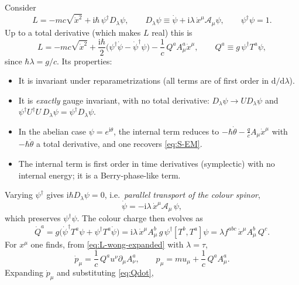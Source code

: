 \documentclass[11pt,a4paper]{book}
\numberwithin{equation}{section}
\newcommand{\dd}{\mathrm{d}}
\newcommand{\ii}{\mathrm{i}}
\theoremstyle{definition}
\theoremstyle{remark}
\begin{document}
Consider
\begin{equation}
  L=-mc\sqrt{\dot x^2}+\ii\hbar\,\psi^\dagger D_\lambda\psi,\qquad
  D_\lambda\psi\equiv\dot\psi+\ii\lambda\,\dot x^\mu\mathcal A_\mu\psi,\qquad
  \psi^\dagger\psi=1 .
  \label{eq:L-wong}
\end{equation}
Up to a total derivative (which makes $L$ real) this is
\begin{equation}
  L=-mc\sqrt{\dot x^2}+\frac{\ii\hbar}2\bigl(\psi^\dagger\dot\psi-\dot\psi^\dagger\psi\bigr)
  -\frac1c\,Q^aA^a_\mu\dot x^\mu,\qquad
  Q^a\equiv g\,\psi^\dagger T^a\psi,
  \label{eq:L-wong-expanded}
\end{equation}
since $\hbar\lambda=g/c$.  Its properties:
\begin{itemize}[leftmargin=*]
\item It is invariant under reparametrizations (all terms are of first order
  in $\dd/\dd\lambda$).
\item It is \emph{exactly} gauge invariant, with no total derivative:
  $D_\lambda\psi\to U D_\lambda\psi$ and $\psi^\dagger U^\dagger U\,D_\lambda\psi=\psi^\dagger D_\lambda\psi$.
\item In the abelian case $\psi=e^{\ii\theta}$, the internal term reduces to
  $-\hbar\dot\theta-\tfrac qcA_\mu\dot x^\mu$ with $-\hbar\dot\theta$ a total
  derivative, and one recovers \eqref{eq:S-EM}.
\item The internal term is first order in time derivatives (symplectic)
  with no internal energy; it is a Berry-phase-like term.
\end{itemize}
Varying $\psi^\dagger$ gives $\ii\hbar D_\lambda\psi=0$, i.e.\ \emph{parallel
transport of the colour spinor},
\begin{equation}
  \dot\psi=-\ii\lambda\,\dot x^\mu\mathcal A_\mu\,\psi ,
  \label{eq:psi-transport}
\end{equation}
which preserves $\psi^\dagger\psi$.  The colour charge then evolves as
\begin{equation}
  \dot Q^a=g\bigl(\dot\psi^\dagger T^a\psi+\psi^\dagger T^a\dot\psi\bigr)
  =\ii\lambda\,\dot x^\mu A^b_\mu\,g\,\psi^\dagger[T^b,T^a]\psi
  =\lambda f^{abc}\,\dot x^\mu A^b_\mu\,Q^c .
  \label{eq:Qdot}
\end{equation}
For $x^\mu$ one finds, from \eqref{eq:L-wong-expanded} with $\lambda=\tau$,
\begin{equation}
  \dot p_\mu=\frac1c\,Q^au^\nu\partial_\mu A^a_\nu,\qquad
  p_\mu=m u_\mu+\frac1c\,Q^aA^a_\mu .
\end{equation}
Expanding $\dot p_\mu$ and substituting \eqref{eq:Qdot},
\end{document}
